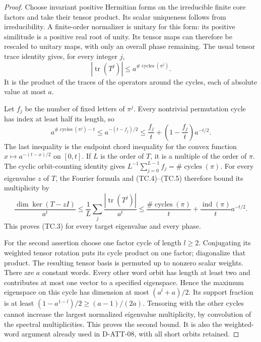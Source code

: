 \begin{proof}
Choose invariant positive Hermitian forms on the irreducible
finite core factors and take their tensor product. Its scalar
uniqueness follows from irreducibility. A finite-order normalizer
is unitary for this form: its positive similitude is a positive
real root of unity. Its tensor maps can therefore be rescaled
to unitary maps, with only an overall phase remaining.
The usual tensor trace identity gives, for every integer $j$,
\[
 |\operatorname{tr}(T^j)|\le
                       a^{\#\operatorname{cycles}(\pi^j)}.
                                                               \tag{TC.4}
\]
It is the product of the traces of the operators around the
cycles, each of absolute value at most $a$.

Let $f_j$ be the number of fixed letters of $\pi^j$.
Every nontrivial permutation cycle has index at least half
its length, so
\[
 a^{\#\operatorname{cycles}(\pi^j)-t}
       \le a^{-(t-f_j)/2}
       \le\frac{f_j}{t}
                  +\left(1-\frac{f_j}{t}\right)a^{-t/2}.
                                                               \tag{TC.5}
\]
The last inequality is the endpoint chord inequality for the
convex function $x\mapsto a^{-(t-x)/2}$ on $[0,t]$.
If $L$ is the order of $T$, it is a multiple of the order
of $\pi$. The cyclic orbit-counting identity gives
$L^{-1}\sum_{j=0}^{L-1}f_j=\#\operatorname{cycles}(\pi)$.
For every eigenvalue $z$ of $T$, the Fourier formula and
(TC.4)--(TC.5) therefore bound its multiplicity by
\[
 \frac{\dim\ker(T-zI)}{a^t}
 \le\frac1L\sum_j\frac{|\operatorname{tr}(T^j)|}{a^t}
 \le\frac{\#\operatorname{cycles}(\pi)}t
       +\frac{\operatorname{ind}(\pi)}t a^{-t/2}.
                                                               \tag{TC.6}
\]
This proves (TC.3) for every target eigenvalue and every phase.

For the second assertion choose one factor cycle of length
$l\ge2$. Conjugating its weighted tensor rotation puts its
cycle product on one factor; diagonalize that product.
The resulting tensor basis is permuted up to nonzero scalar
weights. There are $a$ constant words. Every other word orbit
has length at least two and contributes at most one vector
to a specified eigenspace. Hence the maximum eigenspace on
this cycle has dimension at most $(a^l+a)/2$.
Its support fraction is at least
$(1-a^{1-l})/2\ge(a-1)/(2a)$. Tensoring with the other
cycles cannot increase the largest normalized eigenvalue
multiplicity, by convolution of the spectral multiplicities.
This proves the second bound. It is also the weighted-word
argument already used in D-ATT-08, with all short orbits retained.
\end{proof}

